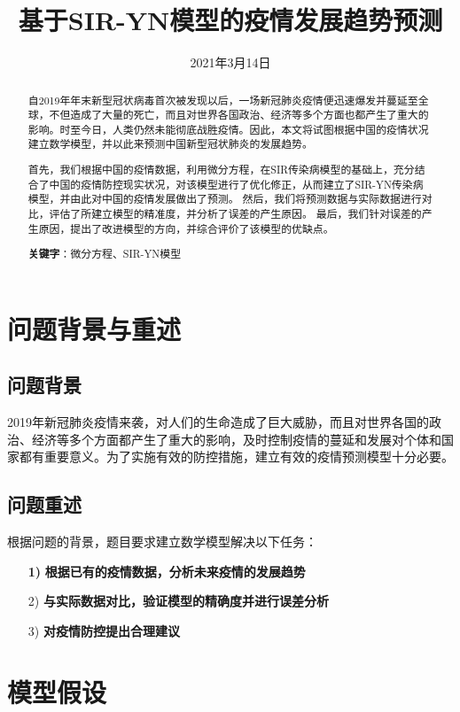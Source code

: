 \documentclass[UTF8]{ctexart}
\title{基于\textbf{SIR-YN}模型的疫情发展趋势预测}
\date{2021年3月14日}
\begin{document}
    \maketitle
	\renewcommand{\abstractname}{\Large 摘要\\}
	\begin{abstract}
		\normalsize
		自2019年年末新型冠状病毒首次被发现以后，一场新冠肺炎疫情便迅速爆发并蔓延至全球，不但造成了大量的死亡，而且对世界各国政治、经济等多个方面也都产生了重大的影响。时至今日，人类仍然未能彻底战胜疫情。因此，本文将试图根据中国的疫情状况建立数学模型，并以此来预测中国新型冠状肺炎的发展趋势。
		
		首先，我们根据中国的疫情数据，利用微分方程，在SIR传染病模型的基础上，充分结合了中国的疫情防控现实状况，对该模型进行了优化修正，从而建立了SIR-YN传染病模型，并由此对中国的疫情发展做出了预测。
然后，我们将预测数据与实际数据进行对比，评估了所建立模型的精准度，并分析了误差的产生原因。
最后，我们针对误差的产生原因，提出了改进模型的方向，并综合评价了该模型的优缺点。

		\textbf{关键字}：微分方程、SIR-YN模型
	\end{abstract}

	
	\section{问题背景与重述}
		\subsection{问题背景}
		2019年新冠肺炎疫情来袭，对人们的生命造成了巨大威胁，而且对世界各国的政治、经济等多个方面都产生了重大的影响，及时控制疫情的蔓延和发展对个体和国家都有重要意义。为了实施有效的防控措施，建立有效的疫情预测模型十分必要。
		\subsection{问题重述}
根据问题的背景，题目要求建立数学模型解决以下任务：
\begin{itemize}
  \item [\bf{1)}]\bf{根据已有的疫情数据，分析未来疫情的发展趋势}
  \item [2)]\bf{与实际数据对比，验证模型的精确度并进行误差分析}
  \item [3)]\bf{对疫情防控提出合理建议}
\end{itemize}


	\section{模型假设}
	
\end{document}
